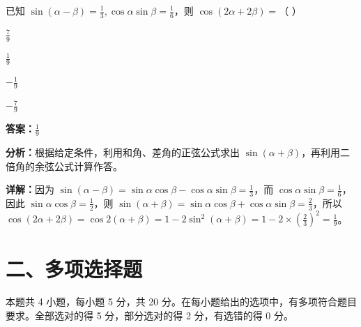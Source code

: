 \begin{question}[points=5]
已知 $\sin(\alpha-\beta)=\frac{1}{3},\cos\alpha\sin\beta=\frac{1}{6}$，则 $\cos(2\alpha+2\beta)=$（ ）
\begin{choices}
  \item $\frac{7}{9}$
  \item $\frac{1}{9}$
  \item $-\frac{1}{9}$
  \item $-\frac{7}{9}$
\end{choices}
\begin{solution}
\textbf{答案：}$\frac{1}{9}$

\textbf{分析：}根据给定条件，利用和角、差角的正弦公式求出 $\sin(\alpha+\beta)$，再利用二倍角的余弦公式计算作答。

\textbf{详解：}因为 $\sin(\alpha-\beta)=\sin\alpha\cos\beta-\cos\alpha\sin\beta=\frac{1}{3}$，而 $\cos\alpha\sin\beta=\frac{1}{6}$，因此 $\sin\alpha\cos\beta=\frac{1}{2}$，则 $\sin(\alpha+\beta)=\sin\alpha\cos\beta+\cos\alpha\sin\beta=\frac{2}{3}$，所以 $\cos(2\alpha+2\beta)=\cos2(\alpha+\beta)=1-2\sin^2(\alpha+\beta)=1-2\times(\frac{2}{3})^2=\frac{1}{9}$。
\end{solution}
\end{question}

\section*{二、多项选择题}
本题共 4 小题，每小题 5 分，共 20 分。在每小题给出的选项中，有多项符合题目要求。全部选对的得 5 分，部分选对的得 2 分，有选错的得 0 分。

